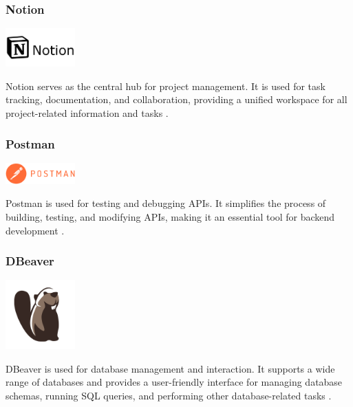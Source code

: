 \subsubsection*{Notion}
\begin{center}
\includegraphics[width=0.2\textwidth]{Images/logos/62cc159e150d5de9a3dad5ec.png}
\label{fig:notion}
\end{center}
Notion serves as the central hub for project management. It is used for task tracking, documentation, and collaboration, providing a unified workspace for all project-related information and tasks \cite{notion}.

\subsubsection*{Postman}
\begin{center}
\includegraphics[width=0.2\textwidth]{Images/logos/62cc1b6b150d5de9a3dad5f9.png}
\label{fig:postman}
\end{center}
Postman is used for testing and debugging APIs. It simplifies the process of building, testing, and modifying APIs, making it an essential tool for backend development \cite{postman}.

\clearpage

\subsubsection*{DBeaver}
\begin{center}
\includegraphics[width=0.2\textwidth]{Images/logos/DBeaver_logo.png}
\label{fig:dbeaver}
\end{center}
DBeaver is used for database management and interaction. It supports a wide range of databases and provides a user-friendly interface for managing database schemas, running SQL queries, and performing other database-related tasks \cite{dbeaver}.

